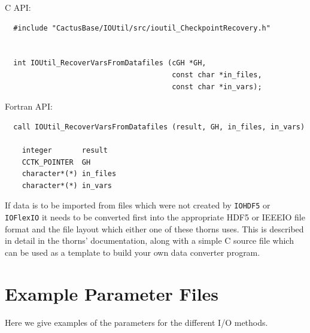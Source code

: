\documentclass{article}
\begin{document}
C API:
\begin{verbatim}
  #include "CactusBase/IOUtil/src/ioutil_CheckpointRecovery.h"


  int IOUtil_RecoverVarsFromDatafiles (cGH *GH,
                                       const char *in_files,
                                       const char *in_vars);
\end{verbatim}

Fortran API:
\begin{verbatim}
  call IOUtil_RecoverVarsFromDatafiles (result, GH, in_files, in_vars)

    integer       result
    CCTK_POINTER  GH
    character*(*) in_files
    character*(*) in_vars
\end{verbatim}

If data is to be imported from files which were not created by {\tt IOHDF5} or
{\tt IOFlexIO} it needs to be converted first into the appropriate HDF5 or
IEEEIO file format and the file layout which either one of these thorns uses.
This is described in detail in the thorns' documentation, along with a simple C
source file which can be used as a template to build your own data converter
program.


\section{Example Parameter Files}

Here we give examples of the parameters for the different I/O methods.
\end{document}
